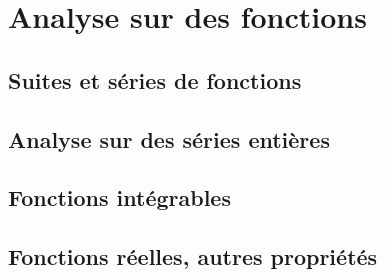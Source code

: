 \chapter{Analyse sur des fonctions}
% 

\section{Suites et s\'eries de fonctions}


\section{Analyse sur des s\'eries enti\`eres}


\section{Fonctions int\'egrables}


\section{Fonctions r\'eelles, autres propri\'et\'es}



% 

